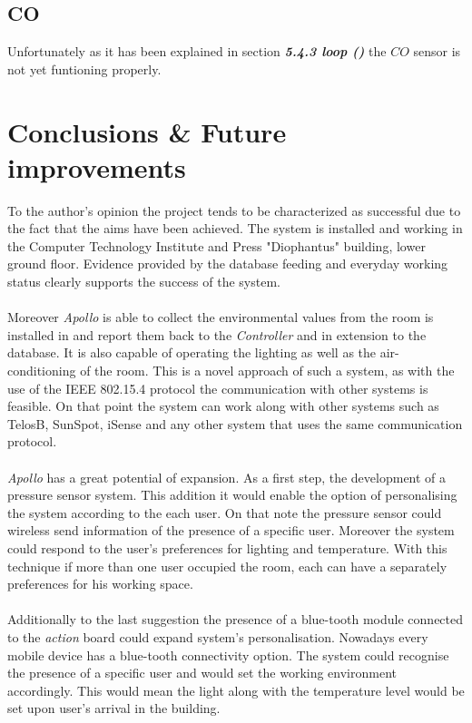 \documentclass[12pt,a4paper,draft]{report}
\begin{document}
\section{CO}
%
Unfortunately as it has been explained in section \textit{\textbf{5.4.3 loop ()}} the $CO$ sensor is not yet funtioning properly.
\newpage
%
\chapter{Conclusions \& Future improvements}
%
To the author's opinion the project tends to be characterized as successful due to the fact that the aims have been achieved. The system is installed and working in the Computer Technology Institute and Press "Diophantus" building, lower ground floor. Evidence provided by the database feeding and everyday working status clearly supports the success of the system.\\
\ \\
Moreover \emph{Apollo} is able to collect the environmental values from the room is installed in and report them back to the \textit{Controller} and in extension to the database. It is also capable of operating the lighting as well as the air-conditioning of the room. This is a novel approach of such a system, as with the use of the IEEE 802.15.4 protocol the communication with other systems is feasible. On that point the system can work along with other systems such as TelosB, SunSpot, iSense and any other system that uses the same communication protocol. \\
\ \\
\emph{Apollo} has a great potential of expansion. As a first step, the development of a pressure sensor system. This addition it would enable the option of personalising the system according to the each user. On that note the pressure sensor could wireless send information of the presence of a specific user. Moreover the system could respond to the user's preferences for lighting and temperature. With this technique if more than one user occupied the room, each can have a separately preferences for his working space.\\
\ \\
Additionally to the last suggestion the presence of a blue-tooth module connected to the \textit{action} board could expand system's personalisation. Nowadays every mobile device has a blue-tooth connectivity option. The system could recognise the presence of a specific user and would set the working environment accordingly. This would mean the light along with the temperature level would be set upon user's arrival in the building. \\
\end{document}
